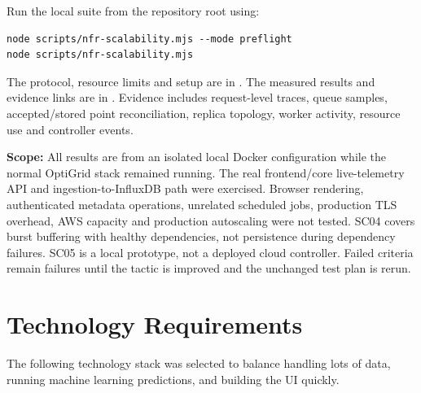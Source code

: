 \documentclass[12pt, a4paper]{article}
\begin{document}
Run the local suite from the repository root using:
\begin{verbatim}
node scripts/nfr-scalability.mjs --mode preflight
node scripts/nfr-scalability.mjs
\end{verbatim}

The protocol, resource limits and setup are in
. The measured results and evidence links
are in . Evidence includes
request-level traces, queue samples, accepted/stored point reconciliation,
replica topology, worker activity, resource use and controller events.

\textbf{Scope:} All results are from an isolated local Docker configuration
while the normal OptiGrid stack remained running. The real frontend/core
live-telemetry API and ingestion-to-InfluxDB path were exercised. Browser
rendering, authenticated metadata operations, unrelated scheduled jobs,
production TLS overhead, AWS capacity and production autoscaling were not
tested. SC04 covers burst buffering with healthy dependencies, not persistence
during dependency failures. SC05 is a local prototype, not a deployed cloud
controller. Failed criteria remain failures until the tactic is improved and
the unchanged test plan is rerun.

\newpage
\section{Technology Requirements}

The following technology stack was selected to balance handling lots of data, running machine learning predictions, and building the UI quickly.
\end{document}

